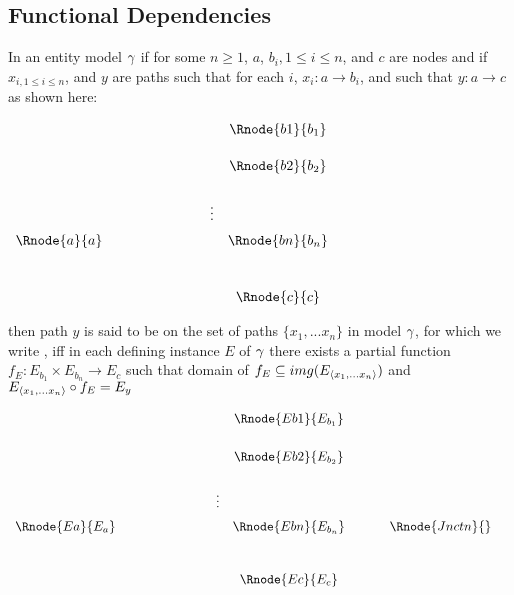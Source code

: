 \subsection{Functional Dependencies}

\begin{definition} %
In an entity model $\gamma$  
if for some $n \geq 1$, $a$, $b_{i}, 1 \leq i \leq n$,  and $c$ are nodes and 
if  $x_{i, 1 \leq i \leq n}$, and $y$ are paths such
that for each $i$, $x_i : a \rightarrow b_i$, and such that $y: a \rightarrow c$ 
as shown here:
\setlength{\arraycolsep}{.2cm}
\begin{center}
$
\begin{array}{cp{2cm}cc}
             & &         & \Rnode{b1}{b_1} \\ [0.5cm]
						 & &         & \Rnode{b2}{b_2} \\ [0.6cm]
						 & & \vdots  &                 \\ [0.2cm]
\Rnode{a}{a} & &         & \Rnode{bn}{b_n} \\ [1.0cm]
             & &         & \Rnode{c}{c}   \\
\end{array}
$
\end{center}


\noindent 
then path $y$ is said to be  on the set of paths $\{x_1,...x_n\}$ in model $\gamma$, 
for which  we write  ,
iff
 in each defining instance $E$ of $\gamma$ there exists a  partial 
function $f_E: E_{b_1} \times E_{b_n} \rightarrow E_c$ 
\noindent such that 
domain of $f_E \subseteq img(E_{\langle x_1,... x_n \rangle})$ 
and  
$E_{\langle x_1,...x_n\rangle} \circ f_E = E_y$ 
\begin{center}
$
\begin{array}{cp{2cm}ccp{0.5cm}cc}
						    & &         & \Rnode{Eb1}{E_{b_1}}& &                            &        \\ [0.6cm]
						    & &         & \Rnode{Eb2}{E_{b_2}}& &                            &        \\ [0.6cm]
						    & &\vdots  &                      & &                            &        \\ [0.2cm]												
\Rnode{Ea}{E_a} & &         & \Rnode{Ebn}{E_{b_n}}& & \Rnode{Jnctn}{}&  \\ [1.0cm]
						    & &         & \Rnode{Ec}{{E_c}}   & &                            &        \\
\end{array}
$
\end{center}
\end{definition}

